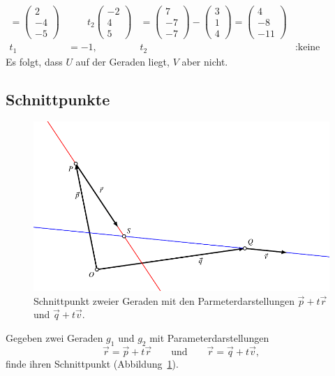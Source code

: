 \begin{beispiel}
\begin{align*}
=
\begin{pmatrix}2\\-4\\-5 \end{pmatrix}
&
\qquad
t_2
\begin{pmatrix}-2\\4\\5\end{pmatrix}
&=
\begin{pmatrix}7\\-7\\-7\end{pmatrix}
-
\begin{pmatrix}3\\1\\4 \end{pmatrix}
=
\begin{pmatrix}4\\-8\\-11\end{pmatrix}
\\
t_1&=-1,&t_2&:\text{keine Lösung.}
\end{align*}
Es folgt, dass $U$ auf der Geraden liegt, $V$ aber nicht.
\end{beispiel}


%
%
\subsection{Schnittpunkte}
\begin{figure}
\centering
\includegraphics{3/images/schnittpunkt.pdf}
\caption{Schnittpunkt zweier Geraden mit den Parmeterdarstellungen
$\vec{p}+t\vec{r}$ und $\vec{q}+t\vec{v}$.
\label{skript:affin:schnittpunkt}}
\end{figure}

\begin{aufgabe}
Gegeben zwei Geraden $g_1$ und $g_2$ mit Parameterdarstellungen
\[
\vec{r} = \vec{p} + t\vec{r}
\qquad\text{und}\qquad
\vec{r} = \vec{q} + t\vec{v},
\]
finde ihren Schnittpunkt (Abbildung~\ref{skript:affin:schnittpunkt}).
\end{aufgabe}

